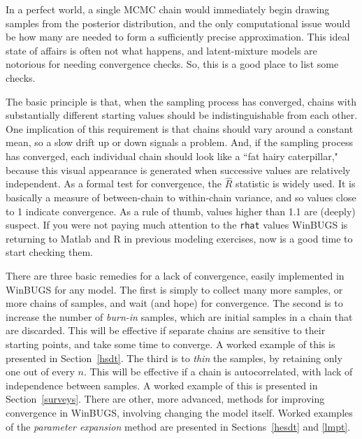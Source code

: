 \documentclass{bayeshyp}
\begin{document}
\lipsum

\begin{graybg}
  In a perfect world, a single MCMC chain would immediately begin drawing
  samples from the posterior distribution, and the only computational issue
  would be how many are needed to form a sufficiently precise approximation.
  This ideal state of affairs is often not what happens, and latent-mixture
  models are notorious for needing convergence checks. So, this is a good place
  to list some checks.\cite{Gelman1996,GelmanHill2007}

  The basic principle is that, when the sampling process has converged, chains
  with substantially different starting values should be indistinguishable from
  each other. One implication of this requirement is that chains should vary
  around a constant mean, so a slow drift up or down signals a problem. And, if
  the sampling process has converged, each individual chain should look like a
  ``fat hairy caterpillar," because this visual appearance is generated when
  successive values are relatively independent. As a formal test for
  convergence, the $\hat{R}$ statistic\cite{GelmanRubin1992} is widely used.
  It is basically a measure of between-chain to within-chain variance, and so
  values close to 1 indicate convergence. As a rule of thumb, values higher
  than 1.1 are (deeply) suspect. If you were not paying much attention to the
  \texttt{rhat} values WinBUGS is returning to Matlab and R in previous
  modeling exercises, now is a good time to start checking them.

  There are three basic remedies for a lack of convergence, easily implemented
  in WinBUGS for any model. The first is simply to collect many more samples,
  or more chains of samples, and wait (and hope) for convergence. The second is
  to increase the number of \emph{burn-in} samples, which are
  initial samples in a chain that are discarded. This will be effective if
  separate chains are sensitive to their starting points, and take some time to
  converge. A worked example of this is presented in Section~\ref{hsdt}. The
  third is to \emph{thin} the samples, by retaining only one
  out of every $n$. This will be effective if a chain is autocorrelated, with
  lack of independence between samples. A worked example of this is presented
  in Section~\ref{surveys}. There are other, more advanced, methods for
  improving convergence in WinBUGS, involving changing the model itself. Worked
  examples of the \emph{parameter expansion} method are presented in
  Sections~\ref{hesdt} and \ref{lmpt}.\label{assessingconvergence}
\end{graybg}
\end{document}
